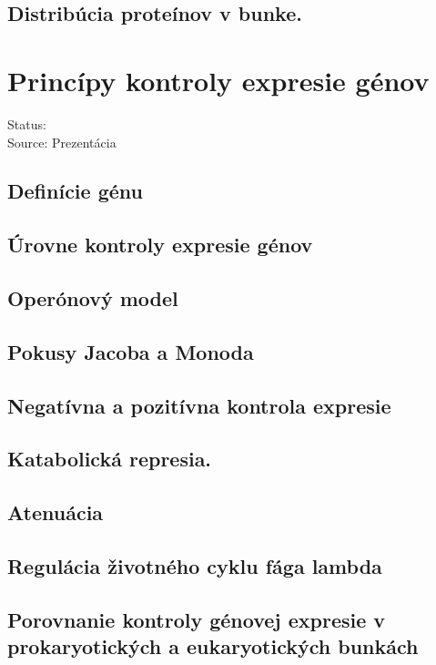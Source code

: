 \subsection{Distribúcia proteínov v bunke.}

\section{Princípy kontroly expresie génov}

Status: \\
Source: Prezentácia \\

\subsection{Definície génu}

\subsection{Úrovne kontroly expresie génov}

\subsection{Operónový model}

\subsection{Pokusy Jacoba a Monoda}

\subsection{Negatívna a pozitívna kontrola expresie}

\subsection{Katabolická represia.}

\subsection{Atenuácia}

\subsection{Regulácia životného cyklu fága lambda}

\subsection{Porovnanie kontroly génovej expresie v prokaryotických a eukaryotických bunkách}

